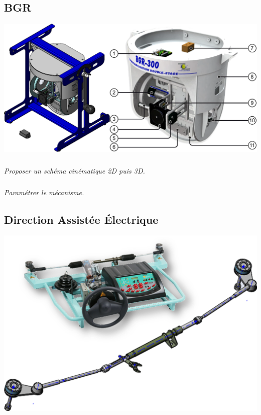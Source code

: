 \documentclass[10pt,fleqn]{article} %
\begin{document}

\vspace{4.5cm}
\pagestyle{fancy}
\thispagestyle{plain}


\def\columnseprulecolor{\color{ocre}}
\setlength{\columnseprule}{0.4pt} 

\begin{multicols}{2}
\subsection*{BGR}
\setcounter{exo}{0}

\begin{center}
\includegraphics[width=\linewidth]{images/bgr_01}
\end{center}

\subparagraph{}
\textit{Proposer un schéma cinématique 2D puis 3D.}

\subparagraph{}
\textit{Paramétrer le mécanisme.}





\subsection*{Direction Assistée Électrique}
\setcounter{exo}{0}
\begin{center}
\includegraphics[width=\linewidth]{images/dae_02}
\end{center}


\end{multicols}
\end{document}
